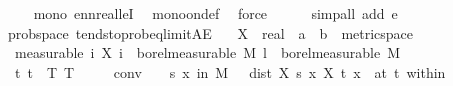 \begin{isabellebody}
\ \ \ \ \isamarkupfalse%
\ mono\ ennreal{\isacharunderscore}{\kern0pt}leI\ \isamarkupfalse%
\ mono{\isacharunderscore}{\kern0pt}on{\isacharunderscore}{\kern0pt}def\ \isamarkupfalse%
\ force\isanewline
\ \ \ \ \isamarkupfalse%
\ {\isacharparenleft}{\kern0pt}simp{\isacharunderscore}{\kern0pt}all\ add{\isacharcolon}{\kern0pt}\ e{\isacharparenright}{\kern0pt}\isanewline
\ \ \ \ \isamarkupfalse%
%
\endisatagproof
{\isafoldproof}%
%
\isadelimproof
\isanewline
%
\endisadelimproof
\isanewline
{}\isamarkupfalse%
\ {\isacharparenleft}{\kern0pt}\ prob{\isacharunderscore}{\kern0pt}space{\isacharparenright}{\kern0pt}\ tendsto{\isacharunderscore}{\kern0pt}prob{\isacharunderscore}{\kern0pt}eq{\isacharunderscore}{\kern0pt}limit{\isacharunderscore}{\kern0pt}AE{\isacharcolon}{\kern0pt}\isanewline
\ \ \ X\ {\isacharcolon}{\kern0pt}{\isacharcolon}{\kern0pt}\ {\isachardoublequoteopen}real\ {\isasymRightarrow}\ {\isacharprime}{\kern0pt}a\ {\isasymRightarrow}\ {\isacharprime}{\kern0pt}b\ {\isacharcolon}{\kern0pt}{\isacharcolon}{\kern0pt}\ metric{\isacharunderscore}{\kern0pt}space{\isachardoublequoteclose}\isanewline
\ \ \ {\isacharbrackleft}{\kern0pt}measurable{\isacharbrackright}{\kern0pt}{\isacharcolon}{\kern0pt}\ {\isachardoublequoteopen}{\isasymAnd}i{\isachardot}{\kern0pt}\ X\ i\ {\isasymin}\ borel{\isacharunderscore}{\kern0pt}measurable\ M{\isachardoublequoteclose}\ {\isachardoublequoteopen}l\ {\isasymin}\ borel{\isacharunderscore}{\kern0pt}measurable\ M{\isachardoublequoteclose}\isanewline
\ \ \ t{\isacharcolon}{\kern0pt}\ {\isachardoublequoteopen}t\ {\isasymin}\ {\isacharbraceleft}{\kern0pt}{}{\isachardot}{\kern0pt}{\isachardot}{\kern0pt}T{\isacharbraceright}{\kern0pt}{\isachardoublequoteclose}\ {\isachardoublequoteopen}T\ {\isasymnoteq}\ {}{\isachardoublequoteclose}\isanewline
\ \ \ conv{\isacharcolon}{\kern0pt}\ {\isachardoublequoteopen}{\isasymforall}{\isasymepsilon}\ {\isachargreater}{\kern0pt}\ {}{\isachardot}{\kern0pt}\ {\isacharparenleft}{\kern0pt}{\isacharparenleft}{\kern0pt}{\isasymlambda}s{\isachardot}{\kern0pt}\ {\isasymP}{\isacharparenleft}{\kern0pt}x\ in\ M{\isachardot}{\kern0pt}\ {\isasymepsilon}\ {\isacharless}{\kern0pt}\ dist\ {\isacharparenleft}{\kern0pt}X\ s\ x{\isacharparenright}{\kern0pt}\ {\isacharparenleft}{\kern0pt}X\ t\ x{\isacharparenright}{\kern0pt}{\isacharparenright}{\kern0pt}{\isacharparenright}{\kern0pt}\ {\isasymlonglongrightarrow}\ {}{\isacharparenright}{\kern0pt}{\isacharparenleft}{\kern0pt}at\ t\ within\ {\isacharbraceleft}{\kern0pt}{}{\isachardot}{\kern0pt}{\isachardot}{\kern0pt}{\isacharbraceright}{\kern0pt}{\isacharparenright}{\kern0pt}{\isachardoublequoteclose}\isanewline

\end{isabellebody}
